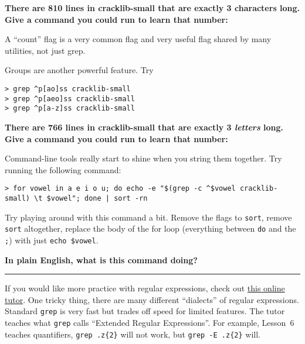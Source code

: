 \documentclass{article}
\begin{document}
\medskip
\noindent
\textbf{There are 810 lines in cracklib-small that are exactly 3 characters
long. Give a command you could run to learn that number:}
\vspace{4em}


\noindent
A ``count'' flag is a very common flag and very useful flag shared by many
utilities, not just grep.

\bigskip
\bigskip
\noindent
Groups are another powerful feature. Try
\begin{lstlisting}
> grep ^p[ao]ss cracklib-small
> grep ^p[aeo]ss cracklib-small
> grep ^p[a-z]ss cracklib-small
\end{lstlisting}

\medskip
\noindent
\textbf{There are 766 lines in cracklib-small that are exactly 3
\emph{letters} long. Give a command you could run to learn that number:}
\vspace{4em}


\medskip
\noindent
Command-line tools really start to shine when you string them together.
Try running the following command:
\begin{lstlisting}
> for vowel in a e i o u; do echo -e "$(grep -c ^$vowel cracklib-small) \t $vowel"; done | sort -rn
\end{lstlisting}
Try playing around with this command a bit. Remove the flags to \texttt{sort},
remove \texttt{sort} altogether, replace the body of the for loop (everything
between \texttt{do} and the \texttt{;}) with just \texttt{echo \$vowel}.

\smallskip
\noindent
\textbf{In plain English, what is this command doing?}
\vspace{4em}


\vfill
\hrule
\smallskip
\noindent
{\footnotesize
  If you would like more practice with regular expressions, check out
  \href{http://regexone.com/}{this online tutor}. One tricky thing, there
  are many different ``dialects'' of regular expressions. Standard
  \texttt{grep} is very fast but trades off speed for limited features. The
  tutor teaches what \texttt{grep} calls ``Extended Regular Expressions''. For
  example, Lesson~6 teaches quantifiers, \texttt{grep .z\{2\}} will not work,
  but \texttt{grep -E .z\{2\}} will.
}
\end{document}
